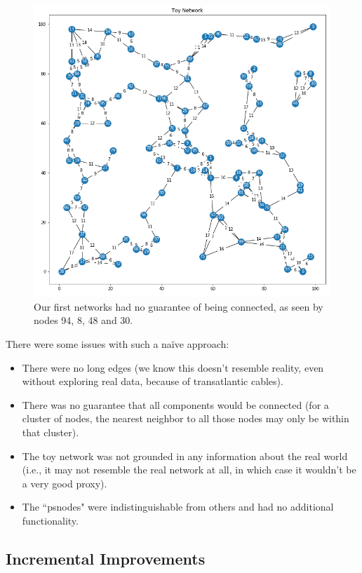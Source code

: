 \documentclass{finalreport}
\begin{document}
\begin{figure}[!ht]
\centering
\includegraphics[width=.8\linewidth]{week_1/Network_416b9f8671a64f04a87bbb59c431dc28.png}
\caption{Our first networks had no guarantee of being \gls{connected}, as seen by nodes 94, 8, 48 and 30.}
\end{figure}

\noindent There were some issues with such a na{\"i}ve approach:

\begin{itemize}
    \item There were no long edges (we know this doesn't resemble reality, even without exploring real data, because of transatlantic cables\cite{transatlantic}).
    \item There was no guarantee that all \glspl{component} would be \gls{connected} (for a cluster of nodes, the nearest neighbor to all those nodes may only be within that cluster).
    \item The toy network was not grounded in any information about the real world (i.e., it may not resemble the real network at all, in which case it wouldn't be a very good proxy).
    \item The ``\glspl{psnode}" were indistinguishable from others and had no additional functionality.
\end{itemize}


\subsection*{Incremental Improvements}
\end{document}
